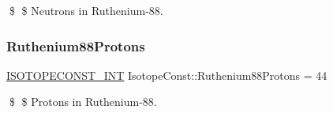 \$ \$ Neutrons in Ruthenium-\/88. \mbox{\label{group___isotope_const-_ruthenium-_ru88_ga38ee38f6628feeb02cb86878728cb40a}} 
\subsubsection{\texorpdfstring{Ruthenium88\+Protons}{Ruthenium88Protons}}
{\footnotesize\ttfamily \mbox{\hyperlink{group___isotope_const-_macros_ga5f18360b3e99483a35c32d789e62621c}{I\+S\+O\+T\+O\+P\+E\+C\+O\+N\+S\+T\+\_\+\+I\+NT}} Isotope\+Const\+::\+Ruthenium88\+Protons = 44}

\$ \$ Protons in Ruthenium-\/88. 